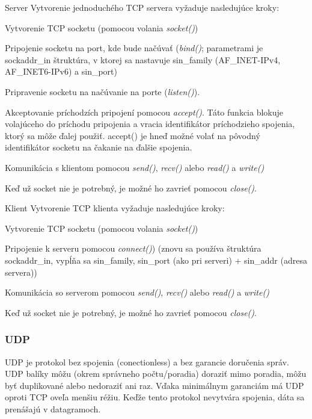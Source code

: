 \begin{obecne}{Server}
Vytvorenie jednoduchého TCP servera vyžaduje nasledujúce kroky:
\begin{pitemize}
\item Vytvorenie TCP socketu (pomocou volania \emph{socket()})
\item Pripojenie socketu na port, kde bude načúvať (\emph{bind()}; parametrami je sockaddr\_in štruktúra, v ktorej sa nastavuje sin\_family (AF\_INET-IPv4,\\AF\_INET6-IPv6) a sin\_port)
\item Pripravenie socketu na načúvanie na porte (\emph{listen()}).
\item Akceptovanie príchodzích pripojení pomocou \emph{accept()}. Táto funkcia blokuje volajúceho do príchodu pripojenia a vracia identifikátor príchodzieho spojenia, ktorý sa môže ďalej použiť. accept() je hneď možné volať na pôvodný identifikátor socketu na čakanie na ďalšie spojenia.
\item Komunikácia s klientom pomocou \emph{send()}, \emph{recv()} alebo \emph{read()} a \emph{write()}
\item Keď už socket nie je potrebný, je možné ho zavrieť pomocou \emph{close()}.
\end{pitemize}
\end{obecne}

\begin{obecne}{Klient}
Vytvorenie TCP klienta vyžaduje nasledujúce kroky:
\begin{pitemize}
\item Vytvorenie TCP socketu (pomocou volania \emph{socket()})
\item Pripojenie k serveru pomocou \emph{connect()}) (znovu sa používa štruktúra sockaddr\_in, vypĺňa sa sin\_family, sin\_port (ako pri serveri) + sin\_addr (adresa servera))
\item Komunikácia so serverom pomocou \emph{send()}, \emph{recv()} alebo \emph{read()} a \emph{write()}
\item Keď už socket nie je potrebný, je možné ho zavrieť pomocou \emph{close()}.
\end{pitemize}
\end{obecne}

\subsubsection*{UDP}
UDP je protokol bez spojenia (conectionless) a bez garancie doručenia správ. UDP balíky môžu (okrem správneho počtu/poradia) doraziť mimo poradia, môžu byť duplikované alebo nedoraziť ani raz. Vďaka minimálnym garanciám má UDP oproti TCP oveľa menšiu réžiu. Keďže tento protokol nevytvára spojenia, dáta sa prenášajú v datagramoch.


